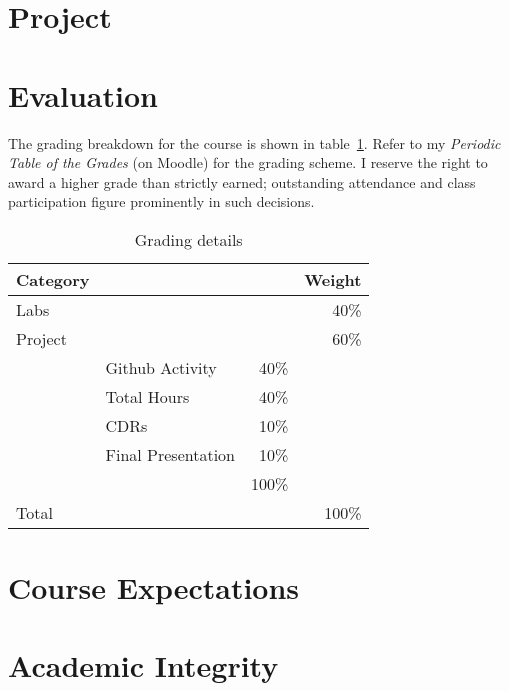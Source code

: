 \documentclass[11pt]{article}
\begin{document}
\section{Project}

\section{Evaluation}

The grading breakdown for the course
is shown in table~\ref{tab:grading}.
Refer to my \emph{Periodic Table of the Grades} (on Moodle)
for the grading scheme.
I reserve the right to award a higher grade than strictly earned;
outstanding attendance and class participation
figure prominently in such decisions.

\begin{table}[htb]
  \centering
  \begin{tabular}{llrr}
    \toprule
    Category &                    &       & Weight \\
    \midrule
    Labs     &                    &       & 40\%   \\
    Project  &                    &       & 60\%   \\
             & Github Activity    & 40\%  &        \\
             & Total Hours        & 40\%  &        \\
             & CDRs               & 10\%  &        \\
             & Final Presentation & 10\%  &        \\
             &                    & 100\% &        \\
    \midrule
    Total    &                    &       & 100\%  \\
    \bottomrule
  \end{tabular}
  \caption{Grading details}
  \label{tab:grading}
\end{table}
\begin{comment}
#+ORGTBL: SEND grades orgtbl-to-latex :splice nil :skip 0 :booktabs t
| Category |                    |      | Weight |
|          |                    |  <r> |    <r> |
|----------+--------------------+------+--------|
| Labs     |                    |      |    40%
| Project  |                    |      |    60%
|          | Github Activity    |  40%
|          | Total Hours        |  40%
|          | CDRs               |  10%
|          | Final Presentation |  10%
|          |                    | 100%
|----------+--------------------+------+--------|
| Total    |                    |      |   100%
\end{comment}

\section{Course Expectations}



\section{Academic Integrity}



\printbibliography{}\label{sec:references}
\end{document}
